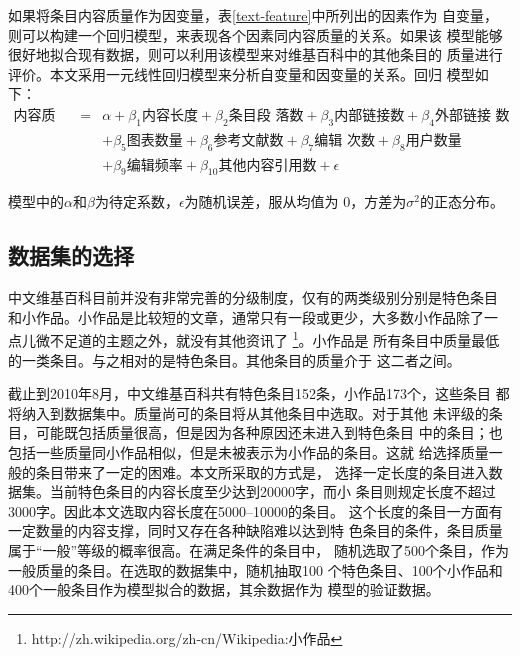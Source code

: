 如果将条目内容质量作为因变量，表\ref{text-feature}中所列出的因素作为
自变量，则可以构建一个回归模型，来表现各个因素同内容质量的关系。如果该
模型能够很好地拟合现有数据，则可以利用该模型来对维基百科中的其他条目的
质量进行评价。本文采用一元线性回归模型来分析自变量和因变量的关系。回归
模型如下：
\begin{eqnarray*}
  \label{eq:1}
  \text{内容质量}&=&\alpha+\beta_1\text{内容长度}+\beta_2 \text{条目段
    落数}+\beta_3\text{内部链接数}+\beta_4\text{外部链接
    数}\\
 &&+\beta_5\text{图表数量} +\beta_6\text{参考文献数}+\beta_7\text{编辑
   次数}+\beta_8\text{用户数量}\\
 &&+\beta_9\text{编辑频率}+\beta_{10}\text{其他内容引用数}+\epsilon
\end{eqnarray*}

模型中的$\alpha$和$\beta$为待定系数，$\epsilon$为随机误差，服从均值为
$0$，方差为$\sigma^2$的正态分布。

\subsection{数据集的选择}
\label{sec:dataset}
中文维基百科目前并没有非常完善的分级制度，仅有的两类级别分别是特色条目
和小作品。小作品是比较短的文章，通常只有一段或更少，大多数小作品除了一
点儿微不足道的主题之外，就没有其他资讯了
\footnote{http://zh.wikipedia.org/zh-cn/Wikipedia:小作品}。小作品是
所有条目中质量最低的一类条目。与之相对的是特色条目。其他条目的质量介于
这二者之间。

截止到2010年8月，中文维基百科共有特色条目152条，小作品173个，这些条目
都将纳入到数据集中。质量尚可的条目将从其他条目中选取。对于其他
未评级的条目，可能既包括质量很高，但是因为各种原因还未进入到特色条目
中的条目；也包括一些质量同小作品相似，但是未被表示为小作品的条目。这就
给选择质量一般的条目带来了一定的困难。本文所采取的方式是，
选择一定长度的条目进入数据集。当前特色条目的内容长度至少达到20000字，而小
条目则规定长度不超过3000字。因此本文选取内容长度在5000--10000的条目。
这个长度的条目一方面有一定数量的内容支撑，同时又存在各种缺陷难以达到特
色条目的条件，条目质量属于“一般”等级的概率很高。在满足条件的条目中，
随机选取了500个条目，作为一般质量的条目。在选取的数据集中，随机抽取100
个特色条目、100个小作品和400个一般条目作为模型拟合的数据，其余数据作为
模型的验证数据。
  
